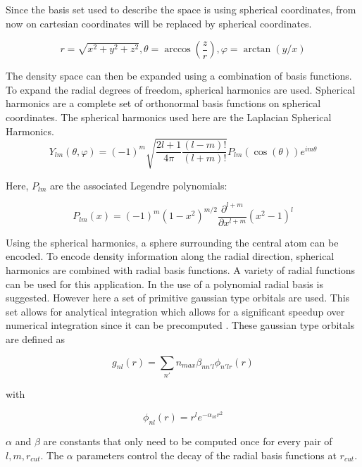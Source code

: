 Since the basis set used to describe the space is using spherical coordinates, from now on
cartesian coordinates will be replaced by spherical coordinates.

$$
r = \sqrt{x^2 + y^2 + z^2}
,
\theta = \arccos(\frac{z}{r})
,
\varphi = \arctan(y / x)
$$ %

The density space can then be expanded using a combination of basis functions.
To expand the radial degrees of freedom, spherical harmonics are used.
Spherical harmonics are a complete set of orthonormal basis functions on spherical coordinates.
The spherical harmonics used here are the Laplacian Spherical Harmonics.
$$
Y_{lm}(\theta, \varphi) = (-1)^m \sqrt{\frac{2l + 1}{4 \pi} \frac{(l - m)!}{(l + m)!}} P_{lm}\left(\cos(\theta) \right) e^{im\theta}
$$

Here, $P_{lm}$ are the associated Legendre polynomials:

$$
P_{lm}(x) = (-1)^m (1-x^2)^{m/2} \frac{\partial^{l+m}}{\partial x^{l+m}}(x^2 - 1)^l
$$ %



Using the spherical harmonics, a sphere surrounding the central atom can be encoded.
To encode density information along the radial direction, spherical harmonics are combined with radial basis functions.
A variety of radial functions can be used for this application.
In \cite{KUHL1982236} the use of a polynomial radial basis is suggested.
However here a set of primitive gaussian type orbitals are used.
This set allows for analytical integration which allows for a significant speedup over numerical integration since it can be precomputed \cite{dscribe}.
These gaussian type orbitals are defined as

$$g_{nl}(r) = \sum_{n'}{n_{max}} \beta_{nn'l} \phi_{n'lr}(r) $$

with 

$$\phi_{nl}(r) = r^l e^{-\alpha_{nl}r^2} $$ %



$\alpha$ and $\beta$ are constants that only need to be computed once for every pair of $l,m, r_{cut}$.
The $\alpha$ parameters control the decay of the radial basis functions at $r_{cut}$.

